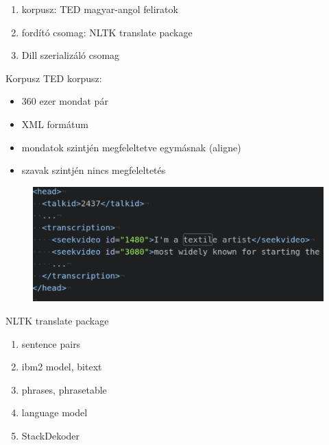 \begin{frame}
	\begin{enumerate}
		\item korpusz: TED magyar-angol feliratok
	
		\item fordító csomag: NLTK translate package
		
		\item Dill szerializáló csomag
		
	\end{enumerate}
\end{frame}


\begin{frame}{Korpusz}
	TED korpusz:
	\begin{itemize}
		\item 360 ezer mondat pár
		\item XML formátum
		\item mondatok szintjén megfeleltetve egymásnak (aligne)
		\item szavak szintjén nincs megfeleltetés
	\end{itemize}
	
	\begin{figure}
		\includegraphics[width=1\textwidth,center]{images/ted}		
	\end{figure}
\end{frame}

\begin{frame}{NLTK translate package}

	\begin{enumerate}
		\item sentence pairs
		\item ibm2 model, bitext
		\item phrases, phrasetable
		\item language model
		\item StackDekoder
	\end{enumerate}

\end{frame}

